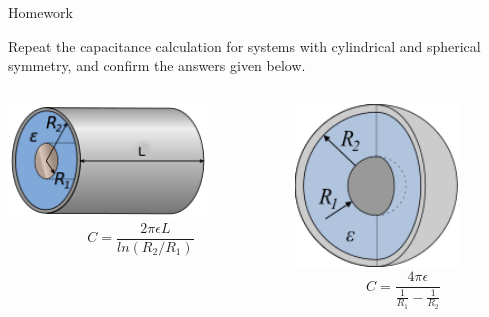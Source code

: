 {
\problemslide

%
%
%

\begin{frame}{Homework}

Repeat the capacitance calculation for systems with cylindrical
and spherical symmetry, and confirm the answers given below.

\begin{columns}
  \begin{column}{0.60\textwidth}
   \begin{center}
     \includegraphics[width=0.75\textwidth]{./images/schematics/capacitors_cylindrical_1.png}\\
     \begin{equation*}
         C = \frac{2 \pi \epsilon L}{ln(R_2/R_1)}
     \end{equation*}
   \end{center}
  \end{column}
  \begin{column}{0.40\textwidth}
   \begin{center}
     \includegraphics[width=0.75\textwidth]{./images/schematics/capacitors_spherical_1.png}\\
     \begin{equation*}
         C = \frac{4 \pi \epsilon}{\frac{1}{R_1}-\frac{1}{R_2}}
     \end{equation*}
   \end{center}
  \end{column}
\end{columns}

\end{frame}

} %




